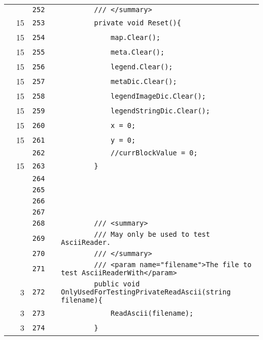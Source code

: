\documentclass[a4paper,landscape,10pt]{article}
\begin{document}
\begin{longtable}[l]{lrrll}
\cellcolor{gray} &  & \verb~252~ & & \verb~        /// </summary>~\\
\cellcolor{green} & 15 & \verb~253~ & & \verb~        private void Reset(){~\\
\cellcolor{green} & 15 & \verb~254~ & & \verb~            map.Clear();~\\
\cellcolor{green} & 15 & \verb~255~ & & \verb~            meta.Clear();~\\
\cellcolor{green} & 15 & \verb~256~ & & \verb~            legend.Clear();~\\
\cellcolor{green} & 15 & \verb~257~ & & \verb~            metaDic.Clear();~\\
\cellcolor{green} & 15 & \verb~258~ & & \verb~            legendImageDic.Clear();~\\
\cellcolor{green} & 15 & \verb~259~ & & \verb~            legendStringDic.Clear();~\\
\cellcolor{green} & 15 & \verb~260~ & & \verb~            x = 0;~\\
\cellcolor{green} & 15 & \verb~261~ & & \verb~            y = 0;~\\
\cellcolor{gray} &  & \verb~262~ & & \verb~            //currBlockValue = 0;~\\
\cellcolor{green} & 15 & \verb~263~ & & \verb~        }~\\
\cellcolor{gray} &  & \verb~264~ & & \verb~~\\
\cellcolor{gray} &  & \verb~265~ & & \verb~~\\
\cellcolor{gray} &  & \verb~266~ & & \verb~~\\
\cellcolor{gray} &  & \verb~267~ & & \verb~~\\
\cellcolor{gray} &  & \verb~268~ & & \verb~        /// <summary>~\\
\cellcolor{gray} &  & \verb~269~ & & \verb~        /// May only be used to test AsciiReader.~\\
\cellcolor{gray} &  & \verb~270~ & & \verb~        /// </summary>~\\
\cellcolor{gray} &  & \verb~271~ & & \verb~        /// <param name="filename">The file to test AsciiReaderWith</param>~\\
\cellcolor{green} & 3 & \verb~272~ & & \verb~        public void OnlyUsedForTestingPrivateReadAscii(string filename){~\\
\cellcolor{green} & 3 & \verb~273~ & & \verb~            ReadAscii(filename);~\\
\cellcolor{green} & 3 & \verb~274~ & & \verb~        }~\\

\end{longtable}
\end{document}
